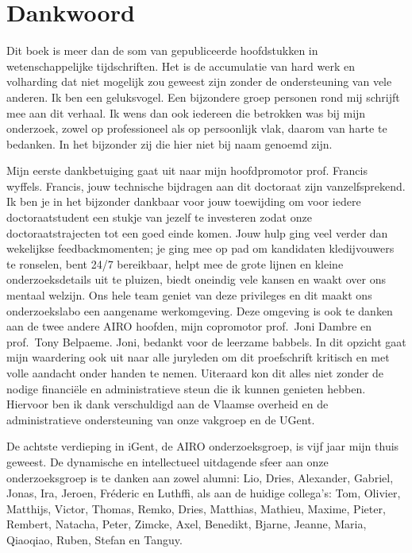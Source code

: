 \documentclass[\home/main.tex]{subfiles}
\begin{document}
\chapter{Dankwoord}

Dit boek is meer dan de som van gepubliceerde hoofdstukken in wetenschappelijke tijdschriften. Het is de accumulatie van hard werk en volharding dat niet mogelijk zou geweest zijn zonder de ondersteuning van vele anderen. Ik ben een geluksvogel. Een bijzondere groep personen rond mij schrijft mee aan dit verhaal. Ik wens dan ook iedereen die betrokken was bij mijn onderzoek, zowel op professioneel als op persoonlijk vlak, daarom van harte te bedanken. In het bijzonder zij die hier niet bij naam genoemd zijn.

Mijn eerste dankbetuiging gaat uit naar mijn hoofdpromotor prof. Francis wyffels.
Francis, jouw technische bijdragen aan dit doctoraat zijn vanzelfsprekend. Ik ben je in het bijzonder dankbaar voor jouw toewijding om voor iedere doctoraatstudent een stukje van jezelf te investeren zodat onze doctoraatstrajecten tot een goed einde komen.
Jouw hulp ging veel verder dan wekelijkse feedbackmomenten; je ging mee op pad om kandidaten kledijvouwers te ronselen, bent 24/7 bereikbaar, helpt mee de grote lijnen en kleine onderzoeksdetails uit te pluizen, biedt oneindig vele kansen en waakt over ons mentaal welzijn.
Ons hele team geniet van deze privileges en dit maakt ons onderzoekslabo een aangename werkomgeving. Deze omgeving is ook te danken aan de twee andere AIRO hoofden, mijn copromotor prof.~Joni Dambre en prof.~Tony Belpaeme. Joni, bedankt voor de leerzame babbels. In dit opzicht gaat mijn waardering ook uit naar alle juryleden om dit proefschrift kritisch en met volle aandacht onder handen te nemen.
Uiteraard kon dit alles niet zonder de nodige financiële en administratieve steun die ik kunnen genieten hebben. Hiervoor ben ik dank verschuldigd aan de Vlaamse overheid en de administratieve ondersteuning van onze vakgroep en de UGent.

De achtste verdieping in iGent, de AIRO onderzoeksgroep, is vijf jaar mijn thuis geweest. De dynamische en intellectueel uitdagende sfeer aan onze onderzoeksgroep is te danken aan zowel alumni: Lio, Dries, Alexander, Gabriel, Jonas, Ira, Jeroen, Fréderic en Luthffi, als aan de huidige collega's: Tom, Olivier, Matthijs, Victor, Thomas, Remko, Dries, Matthias, Mathieu, Maxime, Pieter, Rembert, Natacha, Peter, Zimcke, Axel, Benedikt, Bjarne, Jeanne, Maria, Qiaoqiao, Ruben, Stefan en Tanguy.
\end{document}

